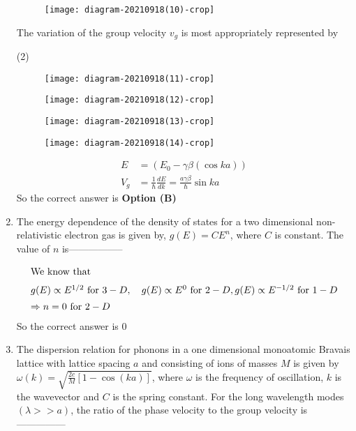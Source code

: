 \begin{enumerate}
	\begin{figure}[H]
		\centering
		\texttt{[image: diagram-20210918(10)-crop]}
	\end{figure}
	The variation of the group velocity $v_{g}$ is most appropriately represented by
{	}
\begin{tasks}(2)
\task[\textbf{A.}] \begin{figure}[H]
	\centering
	\texttt{[image: diagram-20210918(11)-crop]}
\end{figure}
\task[\textbf{B.}] \begin{figure}[H]
	\centering
	\texttt{[image: diagram-20210918(12)-crop]}
\end{figure}
\task[\textbf{C.}] \begin{figure}[H]
	\centering
	\texttt{[image: diagram-20210918(13)-crop]}
\end{figure}
\task[\textbf{D.}] \begin{figure}[H]
	\centering
	\texttt{[image: diagram-20210918(14)-crop]}
\end{figure}
\end{tasks}
\begin{answer}
\begin{align*}
E&=\left(E_{0}-\gamma \beta(\cos k a)\right)\\
V_{g}&=\frac{1}{\hbar} \frac{d E}{d k}=\frac{a \gamma \beta}{\hbar} \sin k a
\end{align*}
So the correct answer is \textbf{Option (B)}
\end{answer}
	\item The energy dependence of the density of states for a two dimensional non-relativistic electron gas is given by, $g(E)=C E^{n}$, where $C$ is constant. The value of $n$ is-----------------
{	}
\begin{answer}
\begin{align*}
\intertext{We know that}
\intertext{$g(E) \propto E^{1 / 2}$ for $3-D, \quad g(E) \propto E^{0}$ for $2-D, g(E) \propto E^{-1 / 2}$ for $1-D$}
\Rightarrow n&=0\text{ for }2-D
\end{align*}
So the correct answer is $0$
\end{answer}
	\item The dispersion relation for phonons in a one dimensional monoatomic Bravais lattice with lattice spacing $a$ and consisting of ions of masses $M$ is given by $\omega(k)=\sqrt{\frac{2 c}{M}[1-\cos (k a)]}$, where $\omega$ is the frequency of oscillation, $k$ is the wavevector and $C$ is the spring constant. For the long wavelength modes $(\lambda>>a)$, the ratio of the phase velocity to the group velocity is---------------

\end{enumerate}
